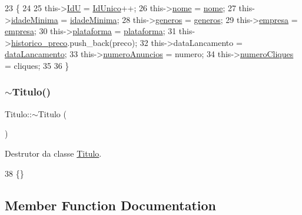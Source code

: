 \begin{DoxyCode}
23                                                                         \{
24 
25     this->\hyperlink{classTitulo_aff7d1cc9accbc0f49c05cdc97c66844c}{IdU} = \hyperlink{classTitulo_a54ff099c5e3bfbf23d4326b4acc73263}{IdUnico}++;
26     this->\hyperlink{classTitulo_a8abdf1fc6d4fc14be20bbec247664d83}{nome} = \hyperlink{classTitulo_a8abdf1fc6d4fc14be20bbec247664d83}{nome};
27     this->\hyperlink{classTitulo_a28891078f53fc3317de60ae739514955}{idadeMinima} = \hyperlink{classTitulo_a28891078f53fc3317de60ae739514955}{idadeMinima};
28     this->\hyperlink{classTitulo_a3209265c8534416978ee9891b96c14b2}{generos} = \hyperlink{classTitulo_a3209265c8534416978ee9891b96c14b2}{generos};
29     this->\hyperlink{classTitulo_a91510c440dc8583d60d88ea02f4eb1b6}{empresa} = \hyperlink{classTitulo_a91510c440dc8583d60d88ea02f4eb1b6}{empresa};
30     this->\hyperlink{classTitulo_a67761eb7f006453ab0869e4b7c0a9c0b}{plataforma} = \hyperlink{classTitulo_a67761eb7f006453ab0869e4b7c0a9c0b}{plataforma};
31     this->\hyperlink{classTitulo_aad5a44ca7e83939e8b47f1e11b80eca2}{historico\_preco}.push\_back(preco);
32     this->dataLancamento = \hyperlink{classTitulo_ae540ddf2c607eb0e4de29eb8c0cca7f0}{dataLancamento};
33     this->\hyperlink{classTitulo_a31919af9268f0c6e55b786457d1df586}{numeroAnuncios} = numero;
34     this->\hyperlink{classTitulo_a7775da325c14a4d76f2d3b0800c28fa3}{numeroCliques} = cliques;
35 
36  \}
\end{DoxyCode}
\mbox{\label{classTitulo_a9b7513f1c255265a1d6ccff0ead30a8c}} 
\subsubsection{\texorpdfstring{$\sim$\+Titulo()}{~Titulo()}}
{\footnotesize\ttfamily Titulo\+::$\sim$\+Titulo (\begin{DoxyParamCaption}{ }\end{DoxyParamCaption})\hspace{0.3cm}{\ttfamily [virtual]}}



Destrutor da classe \hyperlink{classTitulo}{Titulo}. 


\begin{DoxyCode}
38 \{\}
\end{DoxyCode}


\subsection{Member Function Documentation}
\mbox{\label{classTitulo_a8004d12b8ae0d0746b999a6411df150c}} 
